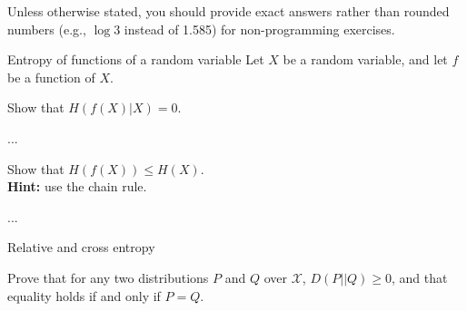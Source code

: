 \documentclass[a4paper,10pt]{article}
\begin{document}
\bigskip
\noindent
Unless otherwise stated, you should provide exact answers rather than rounded numbers (e.g., $\log 3$ instead of 1.585) for non-programming exercises.












\begin{nproblem}{5}{Entropy of functions of a random variable}
Let $X$ be a random variable, and let $f$ be a function of $X$.
\end{nproblem}

\begin{subproblem}{2}
Show that $H(f(X) | X) = 0$.
\end{subproblem}

\begin{solution}
...
\end{solution}

\begin{subproblem}{3}
Show that $H(f(X)) \leq H(X)$. \\\textbf{Hint:} use the chain rule.
\end{subproblem}

\begin{solution}
...
\end{solution}



\begin{nproblem}{8}{Relative and cross entropy}
\end{nproblem}

\begin{subproblem}{5}
Prove that for any two distributions $P$ and $Q$ over $\mathcal{X}$, $D(P||Q) \geq 0$, and that equality holds if and only if $P = Q$.
\end{subproblem}
\end{document}
